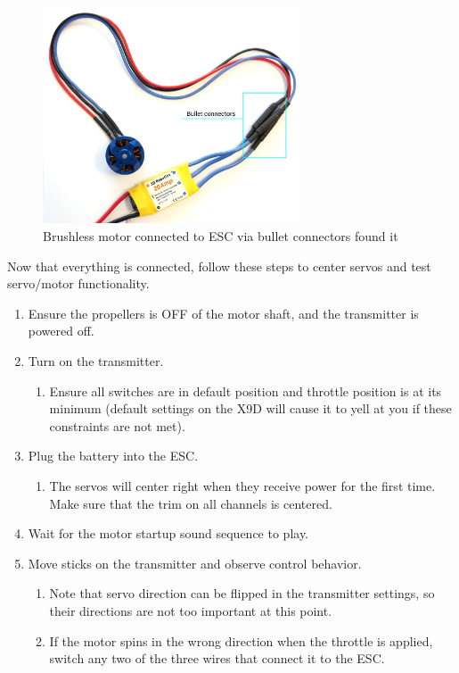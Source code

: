 \documentclass[12pt,journal,compsoc]{IEEEtran}
\begin{document}
\begin{figure}[h!]
\hspace*{0cm}
\centering
\includegraphics[width=3in]{motorToEsc.jpg}
\caption{Brushless motor connected to ESC via bullet connectors found it \cite{mToE}}
\label{motorToEsc}
\end{figure}
Now that everything is connected, follow these steps to center servos and test servo/motor functionality.

\begin{enumerate}
\item Ensure the propellers is OFF of the motor shaft, and the transmitter is powered off.
\item Turn on the transmitter.
	\begin{enumerate}
	\item Ensure all switches are in default position and throttle position is at its minimum (default settings on the X9D will cause it to yell at you if these constraints are not met).
	\end{enumerate}
\item Plug the battery into the ESC.
	\begin{enumerate}
	\item The servos will center right when they receive power for the first time. Make sure that the trim on all channels is centered.
	\end{enumerate}
\item Wait for the motor startup sound sequence to play.
\item Move sticks on the transmitter and observe control behavior.
	\begin{enumerate}
	\item Note that servo direction can be flipped in the transmitter settings, so their directions are not too important at this point.
	\item If the motor spins in the wrong direction when the throttle is applied, switch any two of the three wires that connect it to the ESC.
	\end{enumerate}
\end{enumerate}
\end{document}
